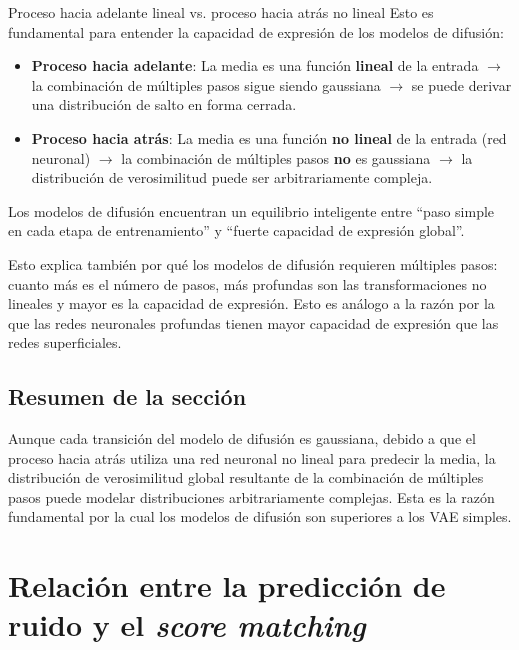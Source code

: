 \documentclass[a4paper]{article}
\begin{document}
\begin{warningbox}{Proceso hacia adelante lineal vs. proceso hacia atrás no lineal}
Esto es fundamental para entender la capacidad de expresión de los modelos de difusión:
\begin{itemize}
    \item \textbf{Proceso hacia adelante}: La media es una función \textbf{lineal} de la entrada $\rightarrow$ la combinación de múltiples pasos sigue siendo gaussiana $\rightarrow$ se puede derivar una distribución de salto en forma cerrada.
    \item \textbf{Proceso hacia atrás}: La media es una función \textbf{no lineal} de la entrada (red neuronal) $\rightarrow$ la combinación de múltiples pasos \textbf{no} es gaussiana $\rightarrow$ la distribución de verosimilitud puede ser arbitrariamente compleja.
\end{itemize}
Los modelos de difusión encuentran un equilibrio inteligente entre ``paso simple en cada etapa de entrenamiento'' y ``fuerte capacidad de expresión global''.
\end{warningbox}

Esto explica también por qué los modelos de difusión requieren múltiples pasos: cuanto más es el número de pasos, más profundas son las transformaciones no lineales y mayor es la capacidad de expresión. Esto es análogo a la razón por la que las redes neuronales profundas tienen mayor capacidad de expresión que las redes superficiales.

\subsection{Resumen de la sección}

Aunque cada transición del modelo de difusión es gaussiana, debido a que el proceso hacia atrás utiliza una red neuronal no lineal para predecir la media, la distribución de verosimilitud global resultante de la combinación de múltiples pasos puede modelar distribuciones arbitrariamente complejas. Esta es la razón fundamental por la cual los modelos de difusión son superiores a los VAE simples.



\section{Relación entre la predicción de ruido y el \textit{score matching}}
\end{document}
